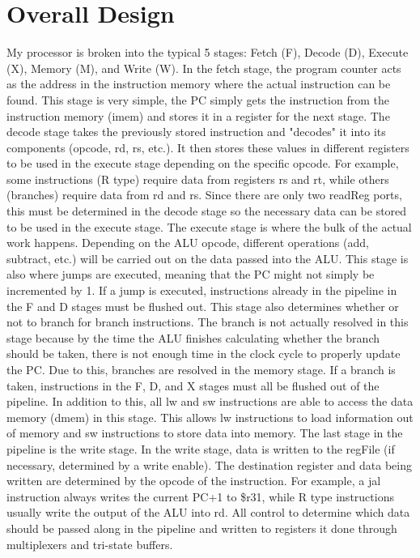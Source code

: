 \documentclass[letterpaper]{article} %
\begin{document}
\section*{Overall Design}
My processor is broken into the typical 5 stages: Fetch (F), Decode (D), Execute (X), Memory (M), and Write (W). In the fetch stage, the program counter acts as the address in the instruction memory where the actual instruction can be found. This stage is very simple, the PC simply gets the instruction from the instruction memory (imem) and stores it in a register for the next stage. The decode stage takes the previously stored instruction and "decodes" it into its components (opcode, rd, rs, etc.). It then stores these values in different registers to be used in the execute stage depending on the specific opcode. For example, some instructions (R type) require data from registers rs and rt, while others (branches) require data from rd and rs. Since there are only two readReg ports, this must be determined in the decode stage so the necessary data can be stored to be used in the execute stage. The execute stage is where the bulk of the actual work happens. Depending on the ALU opcode, different operations (add, subtract, etc.) will be carried out on the data passed into the ALU. This stage is also where jumps are executed, meaning that the PC might not simply be incremented by 1. If a jump is executed, instructions already in the pipeline in the F and D stages must be flushed out. This stage also determines whether or not to branch for branch instructions. The branch is not actually resolved in this stage because by the time the ALU finishes calculating whether the branch should be taken, there is not enough time in the clock cycle to properly update the PC. Due to this, branches are resolved in the memory stage. If a branch is taken, instructions in the F, D, and X stages must all be flushed out of the pipeline. In addition to this, all lw and sw instructions are able to access the data memory (dmem) in this stage. This allows lw instructions to load information out of memory and sw instructions to store data into memory. The last stage in the pipeline is the write stage. In the write stage, data is written to the regFile (if necessary, determined by a write enable). The destination register and data being written are determined by the opcode of the instruction. For example, a jal instruction always writes the current PC+1 to \$r31, while R type instructions usually write the output of the ALU into rd. All control to determine which data should be passed along in the pipeline and written to registers it done through multiplexers and tri-state buffers. 
\end{document}

